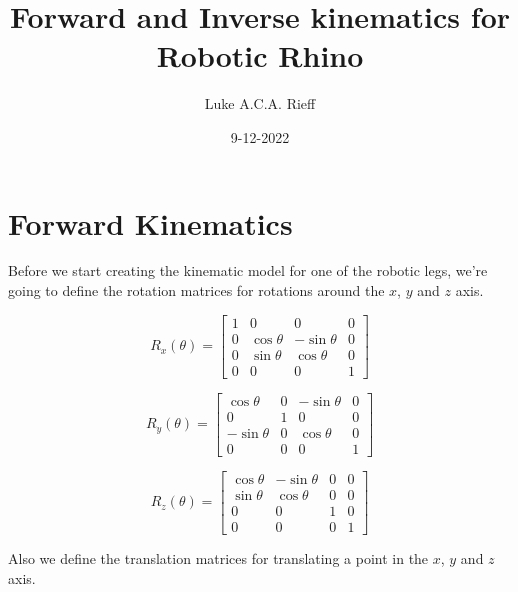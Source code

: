 \documentclass{article}
\author{Luke A.C.A. Rieff}
\title{Forward and Inverse kinematics for Robotic Rhino}
\date{9-12-2022}
\begin{document}
    \maketitle

    \section{Forward Kinematics}

    Before we start creating the kinematic model for one of the robotic legs, we're going to define
    the rotation matrices for rotations around the $x$, $y$ and $z$ axis.

    \begin{equation}
        R_x(\theta) =
        \begin{bmatrix}
            1 & 0 & 0 & 0 \\
            0 & \cos{\theta} & - \sin{\theta} & 0 \\
            0 & \sin{\theta} & \cos{\theta} & 0 \\
            0 & 0 & 0 & 1
        \end{bmatrix}
    \end{equation}

    \begin{equation}
        R_y(\theta) =
        \begin{bmatrix}
            \cos{\theta} & 0 & - \sin{\theta} & 0 \\
            0 & 1 & 0 & 0 \\
            - \sin{\theta} & 0 & \cos{\theta} & 0 \\
            0 & 0 & 0 & 1
        \end{bmatrix}
    \end{equation}

    \begin{equation}
        R_z(\theta) =
        \begin{bmatrix}
            \cos{\theta} & - \sin{\theta} & 0 & 0 \\
            \sin{\theta} & \cos{\theta} & 0 & 0 \\
            0 & 0 & 1 & 0 \\
            0 & 0 & 0 & 1
        \end{bmatrix}
    \end{equation}

    Also we define the translation matrices for translating a point in the $x$, $y$ and $z$ axis.
\end{document}

